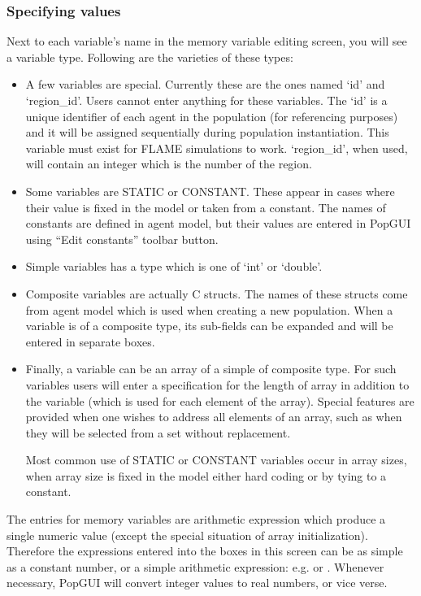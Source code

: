 \documentclass[10pt]{article}
\begin{document}
\subsubsection{Specifying values}
Next to each variable's name in the memory variable editing screen, you will see a variable type. Following are the varieties of these types:
\begin{itemize}
  \item A few variables are special. Currently these are the ones named `id' and `region\_id'. Users cannot enter anything for these variables. The `id' is a unique identifier of each agent in the population (for referencing purposes) and it will be assigned sequentially during population instantiation. This variable must exist for FLAME simulations to work. `region\_id', when used, will contain an integer which is the number of the region.
  \item Some variables are STATIC or CONSTANT. These appear in cases where their value is fixed in the model or taken from a constant. The names of constants are defined in agent model, but their values are entered in PopGUI using ``Edit constants'' toolbar button.
  \item Simple variables has a type which is one of `int' or `double'.
  \item Composite variables are actually C structs. The names of these structs come from agent model which is used when creating a new population. When a variable is of a composite type, its sub-fields can be expanded and will be entered in separate boxes.
  \item Finally, a variable can be an array of a simple of composite type. For such variables users will enter a specification for the length of array in addition to the variable (which is used for each element of the array). Special features are provided when one wishes to address all elements of an array, such as when they will be selected from a set without replacement.

Most common use of STATIC or CONSTANT variables occur in array sizes, when array size is fixed in the model either hard coding or by tying to a constant.
\end{itemize}

The entries for memory variables are arithmetic expression which produce a single numeric value (except the special situation of array initialization). Therefore the expressions entered into the boxes in this screen can be as simple as a constant number, or a simple arithmetic expression: e.g.  or . Whenever necessary, PopGUI will convert integer values to real numbers, or vice verse.
\end{document}
